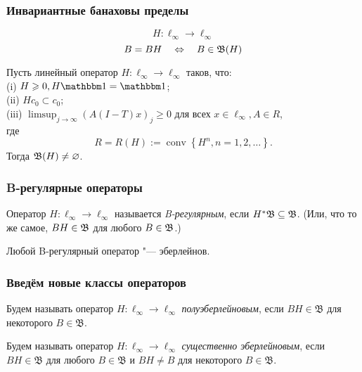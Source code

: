 

\begin{frame}\frametitle{Инвариантные банаховы пределы }
	$$H:\ell_\infty \to \ell_\infty$$
	$$B = BH \quad \Leftrightarrow \quad B\in\mathfrak{B}(H)$$
	\vspace{1em}
	\begin{ttheorem}
		\label{thm:Semenov_Sukochev_conditions}
		Пусть линейный оператор $H:\ell_\infty\to\ell_\infty$ таков, что:
		\\(i)   $H \geqslant 0, H \one=\one$;
		\\(ii)  $H c_0 \subset c_0$;
		\\(iii) $\limsup _{j \rightarrow \infty}(A(I-T) x)_j \geqslant 0$ для всех $x \in \ell_{\infty}, A \in R$,
		\\где
		\begin{equation}
			R=R(H):=\operatorname{conv}\left\{H^n, n=1,2, \ldots\right\}
			.
		\end{equation}
		Тогда $\mathfrak{B}(H) \ne\varnothing$.
	\end{ttheorem}
\end{frame}


\begin{frame}\frametitle{B-регулярные операторы}
	\begin{ddefinition}
		\label{def:B-regular_operator}
		Оператор $H : \ell_\infty \to \ell_\infty$ называется \emph{B-регулярным},
		если $H^*\mathfrak{B} \subseteq \mathfrak{B}$.
		(Или, что то же самое, $BH\in\mathfrak{B}$ для любого $B\in\mathfrak{B}$.)
	\end{ddefinition}
	\begin{ttheorem}
		\label{thm:B-regular_is_Eberlein}
		Любой B-регулярный оператор "--- эберлейнов.
	\end{ttheorem}
\end{frame}


\begin{frame}\frametitle{Введём новые классы операторов}
	\begin{ddefinition}
		Будем называть оператор $H:\ell_\infty \to \ell_\infty$ \emph{полуэберлейновым}, если $BH\in\mathfrak B$ для некоторого $B\in\mathfrak B$.
	\end{ddefinition}

	\begin{ddefinition}
		Будем называть оператор $H:\ell_\infty \to \ell_\infty$ \emph{существенно эберлейновым}, если $BH\in\mathfrak B$ для любого $B\in\mathfrak B$ и $BH\ne B$ для некоторого $B\in\mathfrak B$.
	\end{ddefinition}
\end{frame}


